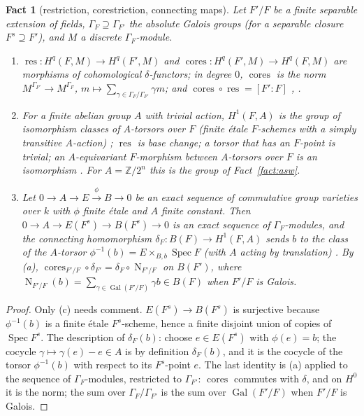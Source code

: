 \documentclass[11pt]{amsart}
\newtheorem{fact}[theorem]{Fact}
\theoremstyle{definition}
\theoremstyle{remark}
\newcommand{\Z}{\mathbb Z}
\newcommand{\res}{\operatorname{res}}
\newcommand{\cores}{\operatorname{cores}}
\newcommand{\Spec}{\operatorname{Spec}}
\newcommand{\Gal}{\operatorname{Gal}}
\newcommand{\Nm}{\operatorname{N}}
\begin{document}
\begin{fact}[restriction, corestriction, connecting maps]\label{fact:gc}
Let $F'/F$ be a finite separable extension of fields, $\Gamma_F\supseteq\Gamma_{F'}$
the absolute Galois groups (for a separable closure $F^s\supseteq F'$), and $M$ a
discrete $\Gamma_F$-module.
\begin{enumerate}[label=\textup{(\alph*)}]
\item $\res\colon H^q(F,M)\to H^q(F',M)$ and $\cores\colon H^q(F',M)\to H^q(F,M)$ are
morphisms of cohomological $\delta$-functors; in degree $0$, $\cores$ is the norm
$M^{\Gamma_{F'}}\to M^{\Gamma_F}$, $m\mapsto\sum_{\gamma\in\Gamma_F/\Gamma_{F'}}\gamma m$;
and $\cores\circ\res=[F':F]$ \cite[Prop.~1.5.2, Cor.~1.5.7]{NSW}, \cite[I.2.4]{Se}.
\item For a finite abelian group $A$ with trivial action, $H^1(F,A)$ is the group of
isomorphism classes of $A$-torsors over $F$ (finite \'etale $F$-schemes with a simply
transitive $A$-action) \cite[I.5.2]{Se}; $\res$ is base change; a torsor that has an
$F$-point is trivial; an $A$-equivariant $F$-morphism between $A$-torsors over $F$ is an
isomorphism \cite[proof of Lemma 2.3]{P}. For $A=\Z/2^n$ this is the group of
Fact~\ref{fact:asw}.
\item Let $0\to A\to E\xrightarrow{\phi}B\to0$ be an exact sequence of commutative
group varieties over $k$ with $\phi$ finite \'etale and $A$ finite constant. Then
$0\to A\to E(F^s)\to B(F^s)\to0$ is an exact sequence of $\Gamma_F$-modules, and the
connecting homomorphism $\delta_F\colon B(F)\to H^1(F,A)$ sends $b$ to the class of the
$A$-torsor $\phi^{-1}(b)=E\times_{B,b}\Spec F$ (with $A$ acting by translation)
\cite[I.5.4--5.6]{Se}. By (a), $\cores_{F'/F}\circ\delta_{F'}=\delta_F\circ\Nm_{F'/F}$
on $B(F')$, where $\Nm_{F'/F}(b)=\sum_{\gamma\in\Gal(F'/F)}\gamma b\in B(F)$ when $F'/F$
is Galois.
\end{enumerate}
\end{fact}

\begin{proof}
Only (c) needs comment. $E(F^s)\to B(F^s)$ is surjective because $\phi^{-1}(b)$ is a
finite \'etale $F^s$-scheme, hence a finite disjoint union of copies of $\Spec F^s$. The
description of $\delta_F(b)$: choose $e\in E(F^s)$ with $\phi(e)=b$; the cocycle
$\gamma\mapsto\gamma(e)-e\in A$ is by definition $\delta_F(b)$, and it is the cocycle of
the torsor $\phi^{-1}(b)$ with respect to its $F^s$-point $e$. The last identity is (a)
applied to the sequence of $\Gamma_F$-modules, restricted to $\Gamma_{F'}$: $\cores$
commutes with $\delta$, and on $H^0$ it is the norm; the sum over $\Gamma_F/\Gamma_{F'}$
is the sum over $\Gal(F'/F)$ when $F'/F$ is Galois.
\end{proof}
\end{document}
